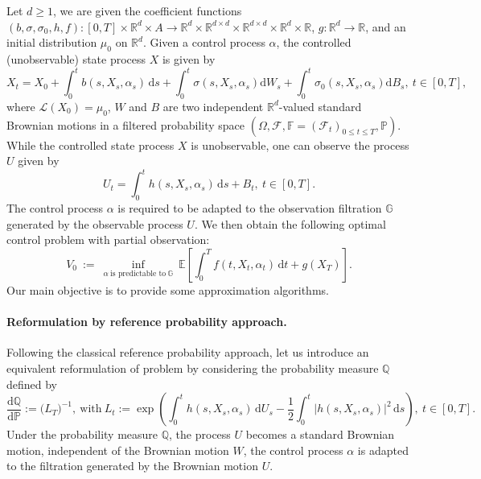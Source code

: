 \documentclass[11pt]{article}
\numberwithin{equation}{section}
\theoremstyle{plain}
\theoremstyle{definition}
\theoremstyle{remark}
\newcommand{\R}{\mathbb{R}}
\newcommand{\dd}{\mathrm{d}}
\newcommand{\Fc}{\mathcal{F}}
\newcommand{\F}{\mathbb{F}}
\newcommand{\G}{\mathbb{G}}
\begin{document}
	Let $d \ge 1$, we are given the coefficient functions $(b, \sigma, \sigma_0, h, f): [0, T] \times \R^d \times A \longrightarrow \mathbb{R}^d\times \mathbb{R}^{d\times d}\times \mathbb{R}^{d\times d} \times \R^d \times \R$, $g: \R^d \longrightarrow \R$,
	and an initial distribution $\mu_0$ on $\R^d$.
	Given a control process $\alpha$, the controlled (unobservable) state process $X$ is given by
	\begin{equation}
		X_t 
		= 
		X_0
		+
		\int_0^t  b(s, X_s, \alpha_s)\,\dd s 
		+
		\int_0^t \sigma(s, X_s,  \alpha_s) \dd W_s 
		+
		\int_0^t \sigma_0(s, X_s, \alpha_s)\dd B_s,
		~t \in [0,T],
	\end{equation}
	where $\mathcal{L}(X_0) = \mu_0$, $W$ and $B$ are two independent $\R^d$-valued standard Brownian motions in a filtered probability space $(\Omega, \mathcal{F}, \F = (\Fc_t)_{0 \le t \le T},  \mathbb{P})$.
	While the controlled state process $X$ is unobservable, one can observe the process $U$ given by
	\begin{equation}
		U_t 
		=
		\int_0^t h(s, X_s, \alpha_s)\,\dd s 
		+ 
		B_t,
		~
		t \in [0,T]. 
	\end{equation}
	The control process $\alpha$ is required to be adapted to the observation filtration $\G$ generated by the observable process $U$.
	We then obtain the following optimal control problem with partial observation:
	\begin{equation} \label{eq:original-prob}
		V_0 
		~:=~
		\inf_{\alpha ~\mbox{is predictable to}~\G} 
		~\mathbb{E} \left[ \int_0^T f(t, X_t,  \alpha_t)\,\dd t + g(X_T) \right].
	\end{equation}
	Our main objective is to provide some approximation algorithms.
	
	\paragraph{Reformulation by reference probability approach.}
	
	Following the classical reference probability approach, let us introduce an equivalent reformulation of problem by considering the probability measure $\mathbb{Q}$ defined by 
	\begin{equation} \label{eq:change-of-measure}
		\frac{\dd \mathbb{Q}}{\dd \mathbb{P}}
		:= \big(L_T \big)^{-1}, 
		~\mbox{with}~
		L_t:= \exp\left( \int_0^t h(s,X_s, \alpha_s)\,\dd U_s - \frac{1}{2}\int_0^t \big| h(s, X_s, \alpha_s) \big|^2\,\dd s\right),
		~t \in [0,T].
	\end{equation}
	Under the probability measure $\mathbb{Q}$, the process $U$ becomes a standard Brownian motion, independent of the Brownian motion $W$, the control process $\alpha$ is adapted to the filtration generated by the Brownian motion $U$.
	
\end{document}
